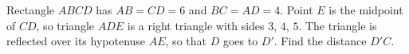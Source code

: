 Rectangle $ABCD$ has $AB=CD=6$ and $BC=AD=4$. Point $E$ is the midpoint of $CD$, so triangle $ADE$ is a right triangle with sides $3$, $4$, $5$. The triangle is reflected over its hypotenuse $AE$, so that $D$ goes to $D'$. Find the distance $D'C$.
